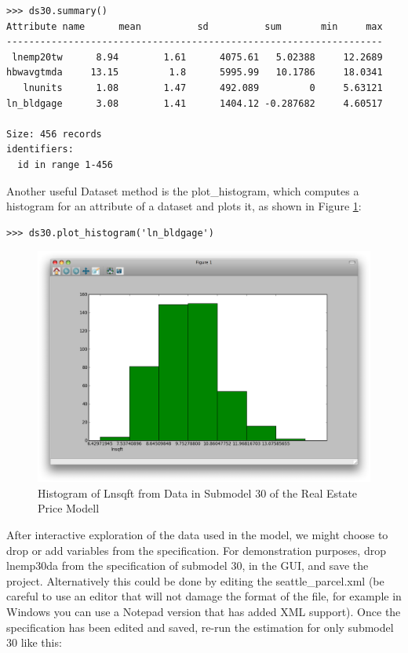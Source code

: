 \begin{verbatim}
>>> ds30.summary()
Attribute name	    mean	      sd	      sum	    min	    max
-------------------------------------------------------------------
 lnemp20tw	    8.94	    1.61	  4075.61	5.02388		12.2689
hbwavgtmda	   13.15	     1.8	  5995.99	10.1786		18.0341
   lnunits	    1.08	    1.47	  492.089	      0		5.63121
ln_bldgage	    3.08	    1.41	  1404.12 -0.287682		4.60517

Size: 456 records
identifiers:
  id in range 1-456
\end{verbatim}


Another useful Dataset method is the plot\_histogram, which
computes a histogram for an attribute of a dataset and plots
it, as shown in Figure \ref{fig:histogram-lnsqft}:
\\

\begin{verbatim}
>>> ds30.plot_histogram('ln_bldgage')
\end{verbatim}

\begin{figure}[htp]
\begin{center}
\includegraphics[scale=0.35]{graphics/histogram-lnsqft.png}
\end{center}
\caption{Histogram of Lnsqft from Data in Submodel 30 of the Real Estate Price Modell}
\label{fig:histogram-lnsqft}
\end{figure}

After interactive exploration of the data used in the model,
we might choose to drop or add variables from the
specification.  For demonstration purposes, drop lnemp30da
from the specification of submodel 30, in the GUI, and save
the project.  Alternatively this could be done by editing
the seattle\_parcel.xml (be careful to use an editor that
will not damage the format of the file, for example in
Windows you can use a Notepad version that has added XML
support). Once the specification has been edited and saved,
re-run the estimation for only submodel 30 like this:
\\

